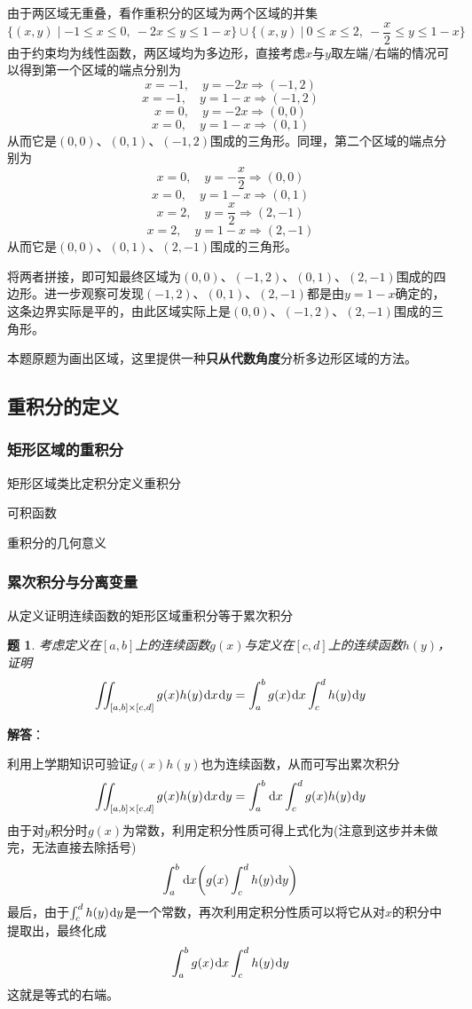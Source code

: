 \documentclass[a4paper,UTF8,fontset=windows,AutoFakeBold]{ctexart}
\newcommand*{\dr}{\hspace{0.07em}\mathrm{d}}
\newcommand*{\note}{\noindent *}
\theoremstyle{ex}
\newtheorem{exercise}{题}
\newcommand{\sol}[1]{{\vspace{5pt}\kaishu\noindent\textbf{解答}：\vspace{-3pt}
\begin{compactitem}
    \item[] #1
\end{compactitem}
}}
\begin{document}
\begin{enumerate}
{        由于两区域无重叠，看作重积分的区域为两个区域的并集
        $$\{(x,y)\mid-1\le x\le0,\ -2x\le y\le1-x\}\cup\bigg\{(x,y)\ \bigg|\ 0\le x\le2,\ -\frac{x}{2}\le y\le1-x\bigg\}$$
        由于约束均为线性函数，两区域均为多边形，直接考虑$x$与$y$取左端/右端的情况可以得到第一个区域的端点分别为
        $$x=-1,\quad y=-2x\Longrightarrow(-1,2)$$
        $$x=-1,\quad y=1-x\Longrightarrow(-1,2)$$
        $$x=0,\quad y=-2x\Longrightarrow(0,0)$$
        $$x=0,\quad y=1-x\Longrightarrow(0,1)$$
        从而它是$(0,0)$、$(0,1)$、$(-1,2)$围成的三角形。同理，第二个区域的端点分别为
        $$x=0,\quad y=-\frac{x}{2}\Longrightarrow(0,0)$$
        $$x=0,\quad y=1-x\Longrightarrow(0,1)$$
        $$x=2,\quad y=\frac{x}{2}\Longrightarrow(2,-1)$$
        $$x=2,\quad y=1-x\Longrightarrow(2,-1)$$
        从而它是$(0,0)$、$(0,1)$、$(2,-1)$围成的三角形。

        将两者拼接，即可知最终区域为$(0,0)$、$(-1,2)$、$(0,1)$、$(2,-1)$围成的四边形。进一步观察可发现$(-1,2)$、$(0,1)$、$(2,-1)$都是由$y=1-x$确定的，这条边界实际是平的，由此区域实际上是$(0,0)$、$(-1,2)$、$(2,-1)$围成的三角形。

        \note 本题原题为画出区域，这里提供一种\textbf{只从代数角度}分析多边形区域的方法。
    }
\end{enumerate}

\subsection{重积分的定义}
\subsubsection{矩形区域的重积分}
矩形区域类比定积分定义重积分

可积函数

重积分的几何意义

\subsubsection{累次积分与分离变量}
从定义证明连续函数的矩形区域重积分等于累次积分


\begin{framed}
\begin{exercise}\label{separation}
    考虑定义在$[a,b]$上的连续函数$g(x)$与定义在$[c,d]$上的连续函数$h(y)$，证明
    $$\iint_{[a,b]\times[c,d]}g(x)h(y)\dr x\dr y=\int_a^bg(x)\dr x\int_c^dh(y)\dr y$$
\end{exercise}
\sol{
    利用上学期知识可验证$g(x)h(y)$也为连续函数，从而可写出累次积分
    $$\iint_{[a,b]\times[c,d]}g(x)h(y)\dr x\dr y=\int_a^b\dr x\int_c^dg(x)h(y)\dr y$$
    由于对$y$积分时$g(x)$为常数，利用定积分性质可得上式化为(注意到这步并未做完，无法直接去除括号)
    $$\int_a^b\dr x\bigg(g(x)\int_c^dh(y)\dr y\bigg)$$
    最后，由于$\int_c^dh(y)\dr y$是一个常数，再次利用定积分性质可以将它从对$x$的积分中提取出，最终化成
    $$\int_a^bg(x)\dr x\int_c^dh(y)\dr y$$
    这就是等式的右端。
}
\end{framed}
\end{document}
